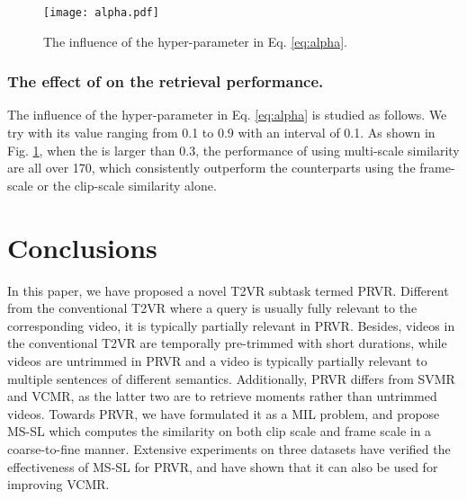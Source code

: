\documentclass[sigconf]{acmart}
\begin{document}
\begin{figure}[tb!]
\centering\texttt{[image: alpha.pdf]}
\vspace{-4mm}
\caption{The influence of the hyper-parameter  in Eq. \ref{eq:alpha}.
}\label{fig:parameter_alpha}
\vspace{-4mm}
\end{figure}

\subsubsection{The effect of  on the retrieval performance.}
The influence of the hyper-parameter  in Eq. \ref{eq:alpha} is studied as follows. We try  with its value ranging from 0.1 to 0.9 with an interval of 0.1. As shown in Fig. \ref{fig:parameter_alpha}, when the  is larger than 0.3, the performance of using multi-scale similarity are all over 170, which consistently outperform the counterparts using the frame-scale or the clip-scale similarity alone. 


\section{Conclusions} \label{sec:conc}
In this paper, we have proposed a novel T2VR subtask termed PRVR.
Different from the conventional T2VR where a query is usually fully relevant to the corresponding video, it is typically partially relevant in PRVR. 
Besides, videos in the conventional T2VR are temporally pre-trimmed with short durations, while videos are untrimmed in PRVR and a video is typically partially relevant to multiple sentences of different semantics. 
Additionally, PRVR differs from SVMR and VCMR, as the latter two are to retrieve moments rather than untrimmed videos.
Towards PRVR, we have formulated it as a MIL problem, and propose MS-SL which computes the similarity on both clip scale and frame scale in a coarse-to-fine manner. Extensive experiments on three datasets have verified the effectiveness of MS-SL for PRVR, and have shown that it can also be used for improving VCMR.

\medskip
\end{document}
